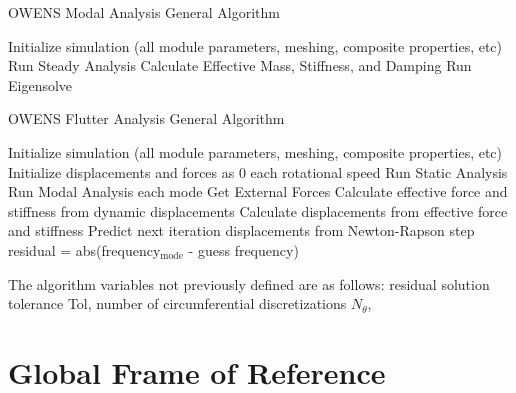 \documentclass[11pt]{article}
\begin{document}
\begin{algorithm}
\caption{OWENS Modal Analysis General Algorithm}
\begin{spacing}{1.18}
\begin{algorithmic}[1]

\State Initialize simulation (all module parameters, meshing, composite properties, etc)
\State Run Steady Analysis
\State Calculate Effective Mass, Stiffness, and Damping
\State Run Eigensolve

\end{algorithmic}
\end{spacing}
\label{alg:Modal}
\end{algorithm}

\begin{algorithm}
\caption{OWENS Flutter Analysis General Algorithm}
\begin{spacing}{1.18}
\begin{algorithmic}[1]
\State Initialize simulation (all module parameters, meshing, composite properties, etc)
\State Initialize displacements and forces as 0
\For each rotational speed
	\State Run Static Analysis
	\State Run Modal Analysis
	\For each mode
			\State Get External Forces
			\State Calculate effective force and stiffness from dynamic displacements
			\State Calculate displacements from effective force and stiffness
			\State Predict next iteration displacements from Newton-Rapson step
			\State residual = abs(frequency$_\text{mode}$ - guess frequency)
		\EndWhile
	\EndFor
\EndFor

\end{algorithmic}
\end{spacing}
\label{alg:Flutter}
\end{algorithm}


 The algorithm variables not previously defined are as follows: residual solution tolerance Tol, number of circumferential discretizations $N_{\theta}$,

\section{Global Frame of Reference}
\end{document}
